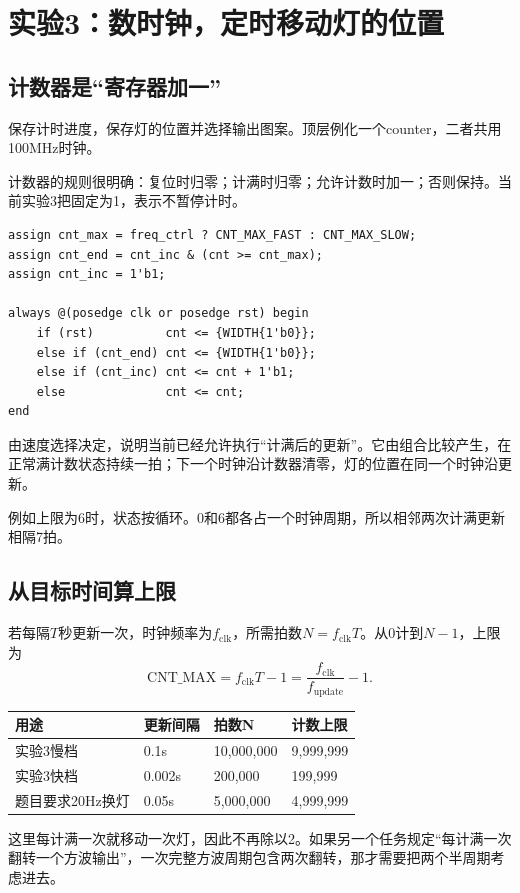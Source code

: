 \clearpage\section{实验3：数时钟，定时移动灯的位置}
\subsection{计数器是“寄存器加一”}
保存计时进度，保存灯的位置并选择输出图案。顶层例化一个counter，二者共用100MHz时钟。

计数器的规则很明确：复位时归零；计满时归零；允许计数时加一；否则保持。当前实验3把固定为1，表示不暂停计时。
\begin{lstlisting}
assign cnt_max = freq_ctrl ? CNT_MAX_FAST : CNT_MAX_SLOW;
assign cnt_end = cnt_inc & (cnt >= cnt_max);
assign cnt_inc = 1'b1;

always @(posedge clk or posedge rst) begin
    if (rst)          cnt <= {WIDTH{1'b0}};
    else if (cnt_end) cnt <= {WIDTH{1'b0}};
    else if (cnt_inc) cnt <= cnt + 1'b1;
    else              cnt <= cnt;
end
\end{lstlisting}
由速度选择决定，说明当前已经允许执行“计满后的更新”。它由组合比较产生，在正常满计数状态持续一拍；下一个时钟沿计数器清零，灯的位置在同一个时钟沿更新。

例如上限为6时，状态按循环。0和6都各占一个时钟周期，所以相邻两次计满更新相隔7拍。

\subsection{从目标时间算上限}
若每隔$T$秒更新一次，时钟频率为$f_{\mathrm{clk}}$，所需拍数$N=f_{\mathrm{clk}}T$。从0计到$N-1$，上限为
\[
\mathrm{CNT\_MAX}=f_{\mathrm{clk}}T-1
=\frac{f_{\mathrm{clk}}}{f_{\mathrm{update}}}-1.
\]
\begin{center}
\begin{tabularx}{\linewidth}{@{}llll@{}}\toprule
用途 & 更新间隔 & 拍数N & 计数上限\\\midrule
实验3慢档 & 0.1s & 10,000,000 & 9,999,999\\
实验3快档 & 0.002s & 200,000 & 199,999\\
题目要求20Hz换灯 & 0.05s & 5,000,000 & 4,999,999\\\bottomrule
\end{tabularx}
\end{center}

这里每计满一次就移动一次灯，因此不再除以2。如果另一个任务规定“每计满一次翻转一个方波输出”，一次完整方波周期包含两次翻转，那才需要把两个半周期考虑进去。

